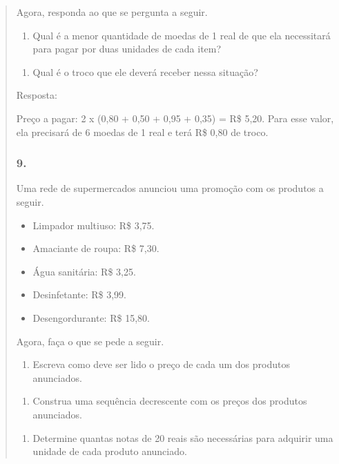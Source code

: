 \begin{enumerate}
\begin{escolha}
\begin{enumerate}
\begin{itemize}
\begin{itemize}
\begin{escolha}
\begin{quote}
\begin{escolha}
Agora, responda ao que se pergunta a seguir.

\begin{enumerate}
\def\labelenumi{\alph{enumi})}
\item
  Qual é a menor quantidade de moedas de 1 real de que ela necessitará para
  pagar por duas unidades de cada item?
\end{enumerate}

\begin{enumerate}
\def\labelenumi{\alph{enumi})}
\item
  Qual é o troco que ele deverá receber nessa situação?
\end{enumerate}

Resposta:

Preço a pagar: 2 x (0,80 + 0,50 + 0,95 + 0,35) = R\$ 5,20. Para esse
valor, ela precisará de 6 moedas de 1 real e terá R\$ 0,80 de troco.

\subsubsection{9.}\label{section-73}

Uma rede de supermercados anunciou uma promoção com os produtos a seguir.

\begin{itemize}
  \item Limpador multiuso: R\$ 3,75.
  \item Amaciante de roupa: R\$ 7,30.
  \item Água sanitária: R\$ 3,25.
  \item Desinfetante: R\$ 3,99.
  \item Desengordurante: R\$ 15,80.
\end{itemize}

Agora, faça o que se pede a seguir.

\begin{enumerate}
\def\labelenumi{\alph{enumi})}
\item
  Escreva como deve ser lido o preço de cada um dos produtos anunciados.
\end{enumerate}

\begin{enumerate}
\def\labelenumi{\alph{enumi})}
\item
  Construa uma sequência decrescente com os preços dos produtos
  anunciados.
\end{enumerate}

\begin{enumerate}
\def\labelenumi{\alph{enumi})}
\item
  Determine quantas notas de 20 reais são necessárias para adquirir uma unidade de
  cada produto anunciado.
\end{enumerate}


\end{escolha}
\end{quote}
\end{escolha}
\end{itemize}
\end{itemize}
\end{enumerate}
\end{escolha}
\end{enumerate}
